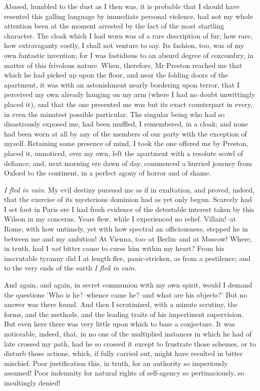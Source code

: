 \documentclass[12pt]{article}
\begin{document}
     Abased, humbled to the dust as I then was, it is probable that
I should have resented this galling language by immediate personal
violence, had not my whole attention been at the moment arrested by
the fact of the most startling character.  The cloak which I had
worn was of a rare description of fur; how rare, how extravaganty 
costly, I shall not venture to say.  Its fashion, too, was of
my own fantastic invention; for I was fastidious to an absurd
degree of coxcombry, in matter of this frivolous nature.  When,
therefore, Mr Preston reached me that which he had picked up upon
the floor, and near the folding doors of the apartment, it was with
an astonishment nearly bordering upon terror, that I perceived my
own already hanging on my arm (where I had no doubt unwittingly
placed it), and that the one presented me was but its exact
counterpart in every, in even the minutest possible particular. 
The singular being who had so disastrously exposed me, had been
muffled, I remembered, in a cloak; and none had been worn at all by
any of the members of our party with the exception of myself. 
Retaining some presence of mind, I took the one offered me by
Preston, placed it, unnoticed, over my own, left the apartment with
a resolute scowl of defiance; and, next morning ere dawn of day,
commenced a hurried journey from Oxford to the continent, in a
perfect agony of horror and of shame.

     \emph{I fled in vain}.  My evil destiny pursued me as if in
exultation, and proved, indeed, that the exercise of its mysterious
dominion had as yet only begun.  Scarcely had I set foot in Paris
ere I had fresh evidence of the detestable interest taken by this
Wilson in my concerns.  Years flew, while I experienced no relief. 
Villain!--at Rome, with how untimely, yet with how spectral an
officiousness, stepped he in between me and my ambition!  At
Vienna, too--at Berlin--and at Moscow!  Where, in truth, had I 
\emph{not} bitter cause to curse him within my heart?  From his
inscrutable tyranny did I at length flee, panic-stricken, as from
a pestilence; and to the very ends of the earth \emph{I fled in vain}.

     And again, and again, in secret communion with my own spirit,
would I demand the questions 'Who is he?--whence came he?--and what
are his objects?'  But no answer was there found.  And then I
scrutinized, with a minute scrutiny, the forms, and the methods,
and the leading traits of his impertinent supervision.  But even
here there was very little upon which to base a conjecture.  It was
noticeable, indeed, that, in no one of the multiplied instances in
which he had of late crossed my path, had he so crossed it except
to frustrate those schemes, or to disturb those actions, which, if
fully carried out, might have resulted in bitter mischief. 
Poor justification this, in truth, for an authority so imperiously
assumed!  Poor indemnity for natural rights of self-agency so
pertinaciously, so insultingly denied!
\end{document}
